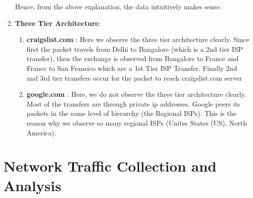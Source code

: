 \documentclass[12pt]{article}
\begin{document}
\begin{enumerate}
    Hence, from the above explanation, the data intuitively makes sense.
    
    \item \textbf{Three Tier Architecture}:
    \begin{enumerate}
        \item \textbf{craigslist.com} : Here we observe the three tier architecture clearly. Since first the packet travels from Delhi to Bangalore (which is a 2nd tier ISP transfer), then the exchange is observed from Bangalore to France and France to San Fransico which are a 1st Tier ISP Transfer. Finally 2nd and 3rd tier transfers occur for the packet to reach craigslist.com server
        \item \textbf{google.com} : Here, we do not observe the three tier architecture clearly. Most of the transfers are through private ip addresses. Google peers its packets in the same level of hierarchy (the Regional ISPs). This is the reason why we observe so many regional ISPs (Unites States (US), North America).
    \end{enumerate}
\end{enumerate}

\section{Network Traffic Collection and Analysis}
\end{document}
